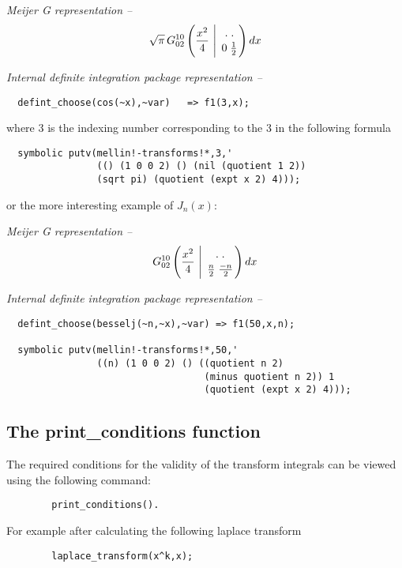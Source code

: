 {\it Meijer G representation --}
\[
\sqrt{\pi} \,G^{1 0}_{0 2}\left(\frac{x^{2}}{4} \ \Bigg\vert
\ \MeijerGparams{ . \; . }{ 0 \; \frac{1}{2}} \right) dx
\]

{\it Internal definite integration package representation --}
\begin{verbatim}
  defint_choose(cos(~x),~var)   => f1(3,x);
\end{verbatim}

where 3 is the indexing number corresponding to the 3
in the following formula

\begin{verbatim}
  symbolic putv(mellin!-transforms!*,3,'
                (() (1 0 0 2) () (nil (quotient 1 2))
                (sqrt pi) (quotient (expt x 2) 4)));
\end{verbatim} 

or the more interesting example of $J_{n}(x)$:

{\it Meijer G representation --}
\[
G^{1 0}_{0 2} \left(\frac{x^{2}}{4} \ \Bigg\vert
\ \MeijerGparams{. \; .}{\frac{n}{2} \; {\frac{-n}{2}}} \right) dx
\]

{\it Internal definite integration package representation --}

\begin{verbatim}
  defint_choose(besselj(~n,~x),~var) => f1(50,x,n);

  symbolic putv(mellin!-transforms!*,50,'
                ((n) (1 0 0 2) () ((quotient n 2)
                                   (minus quotient n 2)) 1
                                   (quotient (expt x 2) 4)));
\end{verbatim} 

\subsection{The print\_conditions function}
\hypertarget{operator:PRINT_CONDITIONS}{}

The required conditions for the validity of the transform integrals
can be viewed using the following command:

\begin{verbatim}
        print_conditions().
\end{verbatim}

For example after calculating the following laplace transform

\begin{verbatim}
        laplace_transform(x^k,x);
\end{verbatim}

